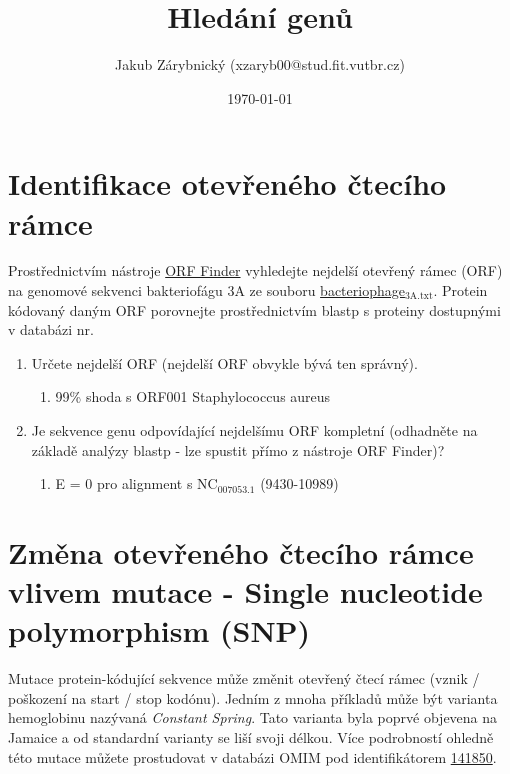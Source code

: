 \documentclass[11pt]{article}
\author{Jakub Zárybnický (xzaryb00@stud.fit.vutbr.cz)}
\date{\today}
\title{Hledání genů}
\begin{document}
\maketitle

\section{Identifikace otevřeného čtecího rámce}
\label{sec:org3b569d0}
Prostřednictvím nástroje \href{https://www.ncbi.nlm.nih.gov/orffinder/}{ORF Finder} vyhledejte nejdelší otevřený rámec (ORF) na
genomové sekvenci bakteriofágu 3A ze souboru \href{./bacteriophage\_3A.txt}{bacteriophage\(_{\text{3A.txt}}\)}. Protein
kódovaný daným ORF porovnejte prostřednictvím blastp s proteiny dostupnými v
databázi nr.

\begin{enumerate}
\item Určete nejdelší ORF (nejdelší ORF obvykle bývá ten správný).
\begin{enumerate}
\item 99\% shoda s ORF001 Staphylococcus aureus
\end{enumerate}
\item Je sekvence genu odpovídající nejdelšímu ORF kompletní (odhadněte na základě
analýzy blastp - lze spustit přímo z nástroje ORF Finder)?
\begin{enumerate}
\item E = 0 pro alignment s NC\(_{\text{007053.1}}\) (9430-10989)
\end{enumerate}
\end{enumerate}

\section{Změna otevřeného čtecího rámce vlivem mutace - Single nucleotide polymorphism (SNP)}
\label{sec:orgb4061d2}
Mutace protein-kódující sekvence může změnit otevřený čtecí rámec (vznik /
poškození na start / stop kodónu). Jedním z mnoha příkladů může být varianta
hemoglobinu nazývaná \emph{Constant Spring}. Tato varianta byla poprvé objevena na
Jamaice a od standardní varianty se liší svoji délkou. Více podrobností ohledně
této mutace můžete prostudovat v databázi OMIM pod identifikátorem \href{http://omim.org/entry/141850}{141850}.
\end{document}
